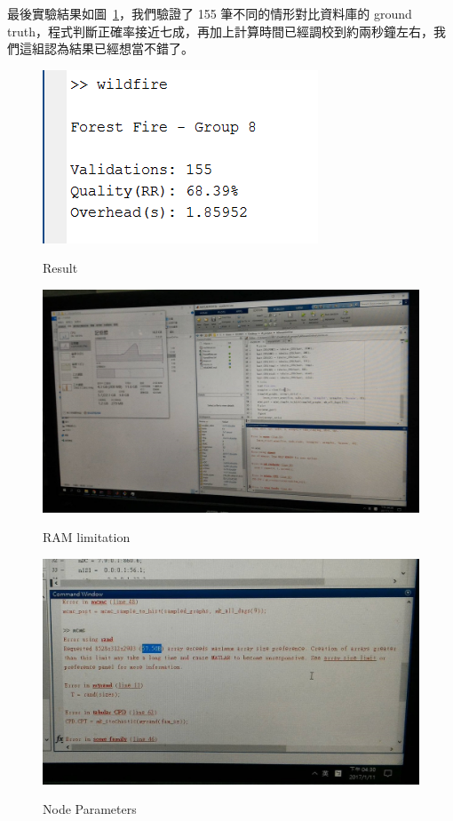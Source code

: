 \documentclass[a4paper]{article}
\begin{document}
最後實驗結果如圖~\ref{result}，我們驗證了 155 筆不同的情形對比資料庫的 ground truth，程式判斷正確率接近七成，再加上計算時間已經調校到約兩秒鐘左右，我們這組認為結果已經想當不錯了。

\begin{figure}[h]
  \caption{Result}
  \centering
  \includegraphics[width=.7\textwidth]{result}
  \label{result}
\end{figure}

\begin{figure}[h]
  \caption{RAM limitation}
  \centering
  \includegraphics[width=1\textwidth]{RAM}
  \label{ram}
\end{figure}

\begin{figure}[h]
  \caption{Node Parameters}
  \centering
  \includegraphics[width=1\textwidth]{57GB}
  \label{param}
\end{figure}



\end{document}
